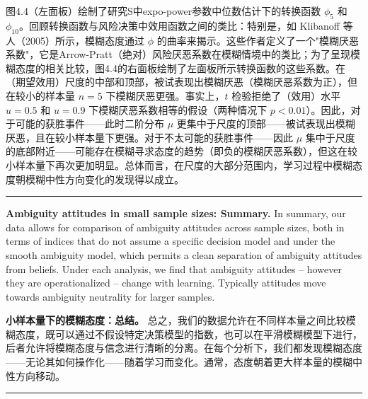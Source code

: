 \documentclass[12pt,a4paper]{article}
\newenvironment{original}
  {\par\vspace{0.5em}\noindent\color{black}\ignorespaces}
  {\par\vspace{0.3em}}
\newenvironment{translation}
  {\par\noindent\color{transblue}\ignorespaces}
  {\par\vspace{0.8em}\hrule\vspace{0.5em}}
\begin{document}
\begin{translation}
图4.4（左面板）绘制了研究S中expo-power参数中位数估计下的转换函数 $\phi_5$ 和 $\phi_{10}$。回顾转换函数与风险决策中效用函数之间的类比：特别是，如 Klibanoff 等人（2005）所示，模糊态度通过 $\phi$ 的曲率来揭示。这些作者定义了一个"模糊厌恶系数"，它是Arrow-Pratt（绝对）风险厌恶系数在模糊情境中的类比；为了呈现模糊态度的相关比较，图4.4的右面板绘制了左面板所示转换函数的这些系数。在（期望效用）尺度的中部和顶部，被试表现出模糊厌恶（模糊厌恶系数为正），但在较小的样本量 $n = 5$ 下模糊厌恶更强。事实上，$t$ 检验拒绝了（效用）水平 $u = 0.5$ 和 $u = 0.9$ 下模糊厌恶系数相等的假设（两种情况下 $p < 0.01$）。因此，对于可能的获胜事件——此时二阶分布 $\mu$ 更集中于尺度的顶部——被试表现出模糊厌恶，且在较小样本量下更强。对于不太可能的获胜事件——因此 $\mu$ 集中于尺度的底部附近——可能存在模糊寻求态度的趋势（即负的模糊厌恶系数），但这在较小样本量下再次更加明显。总体而言，在尺度的大部分范围内，学习过程中模糊态度朝模糊中性方向变化的发现得以成立。
\end{translation}
\begin{original}
\textbf{Ambiguity attitudes in small sample sizes: Summary.} In summary, our data allows for comparison of ambiguity attitudes across sample sizes, both in terms of indices that do not assume a specific decision model and under the smooth ambiguity model, which permits a clean separation of ambiguity attitudes from beliefs. Under each analysis, we find that ambiguity attitudes -- however they are operationalized -- change with learning. Typically attitudes move towards ambiguity neutrality for larger samples.
\end{original}

\begin{translation}
\textbf{小样本量下的模糊态度：总结。} 总之，我们的数据允许在不同样本量之间比较模糊态度，既可以通过不假设特定决策模型的指数，也可以在平滑模糊模型下进行，后者允许将模糊态度与信念进行清晰的分离。在每个分析下，我们都发现模糊态度——无论其如何操作化——随着学习而变化。通常，态度朝着更大样本量的模糊中性方向移动。
\end{translation}
\end{document}
